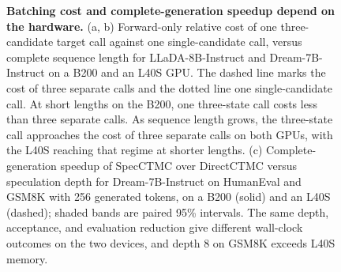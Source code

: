 \begin{figure}[t]
\caption{
\textbf{Batching cost and complete-generation speedup depend on the hardware.}
(a, b) Forward-only relative cost of one three-candidate target call against one single-candidate call, versus complete sequence length for LLaDA-8B-Instruct and Dream-7B-Instruct on a B200 and an L40S GPU. The dashed line marks the cost of three separate calls and the dotted line one single-candidate call. At short lengths on the B200, one three-state call costs less than three separate calls. As sequence length grows, the three-state call approaches the cost of three separate calls on both GPUs, with the L40S reaching that regime at shorter lengths.
(c) Complete-generation speedup of SpecCTMC over DirectCTMC versus speculation depth for Dream-7B-Instruct on HumanEval and GSM8K with 256 generated tokens, on a B200 (solid) and an L40S (dashed); shaded bands are paired 95\% intervals. The same depth, acceptance, and evaluation reduction give different wall-clock outcomes on the two devices, and depth 8 on GSM8K exceeds L40S memory.}
\label{fig:forward-cost-hardware}
\label{fig:depth-hardware}
\end{figure}
